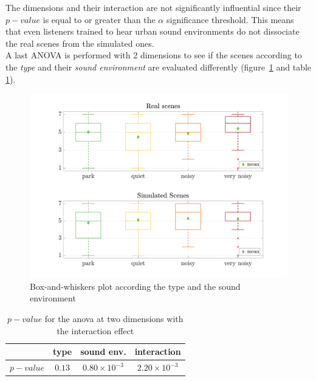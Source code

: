 \documentclass[a4,11pt,twocolumn]{article}
\begin{document}
The dimensions and their interaction are not significantly influential since their $ p-value $ is equal to or greater than the $ \alpha$ significance threshold. This means that even listeners trained to hear urban sound environments do not dissociate the real scenes from the simulated ones.\\

A last ANOVA is performed with 2 dimensions to see if the scenes according to the \textit{type} and their \textit{sound environment} are evaluated differently (figure~\ref{fig:boxplot_type_ambience} and table \ref{tab:p_value_type_ambience}).

\begin{figure}[h]
\centering
\includegraphics[width=\linewidth]{./pictures/testPerceptif_boxplotAmbianceCOLOR_EN.pdf}
\caption{Box-and-whiskers plot according the type and the sound environment}
\label{fig:boxplot_type_ambience}
\end{figure}

\begin{table}[h]
\centering
\begin{tabular}{cccc}
\cline{2-4}
          & type   & sound env. & interaction \\
\hline
$p-value$ & $0.13$ & $0.80 \times 10^{-3}$     & $2.20 \times 10^{-3}$ \\
\hline
\end{tabular}
\caption{$p-value$ for the anova at two dimensions with the interaction effect}
\label{tab:p_value_type_ambience}
\end{table}
\end{document}
